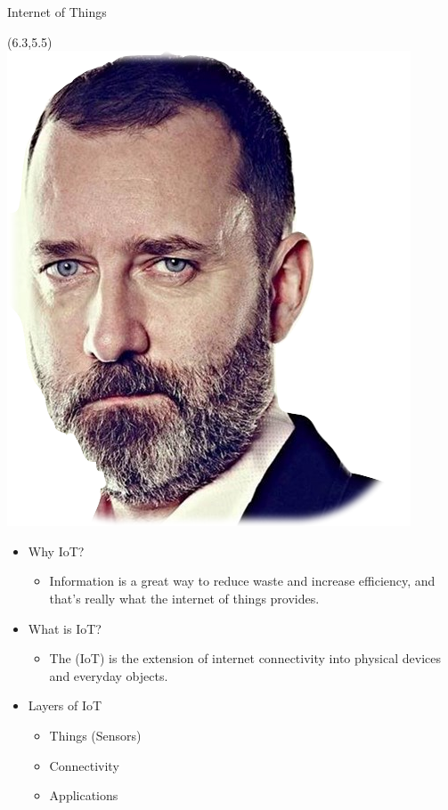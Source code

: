 \documentclass{beamer}
\begin{document}
\begin{frame}[t]{Internet of Things} %

\begin{textblock}{0.5}(6.3,5.5)
\includegraphics[scale=0.2]{figure/kevin1.png}
\end{textblock}


\begin{itemize}

\item Why IoT?

\begin{itemize}
\justifying
\item Information is a great way to reduce waste and increase efficiency, and that's really what the internet of things provides.
\end{itemize}

\item What is IoT?

\begin{itemize}
\justifying
\item The (IoT) is the \hspace{70pt} extension of internet   connectivity into \hspace{100pt} physical devices and everyday objects.
\end{itemize}

\item Layers of IoT

\begin{itemize}
\justifying
\item Things (Sensors)
\item Connectivity
\item Applications
\end{itemize}

\end{itemize}
\end{frame}
\end{document}
